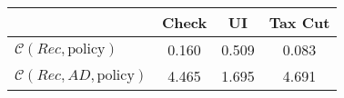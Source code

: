 \begin{tabular}{@{}lccc@{}} 
\toprule 
                          & Check      & UI    & Tax Cut    \\  \midrule 
$\mathcal{C}(Rec,\text{policy})$ & 0.160  & 0.509  & 0.083     \\ 
$\mathcal{C}(Rec, AD,\text{policy})$ & 4.465  & 1.695  & 4.691     \\ 
\end{tabular}  
